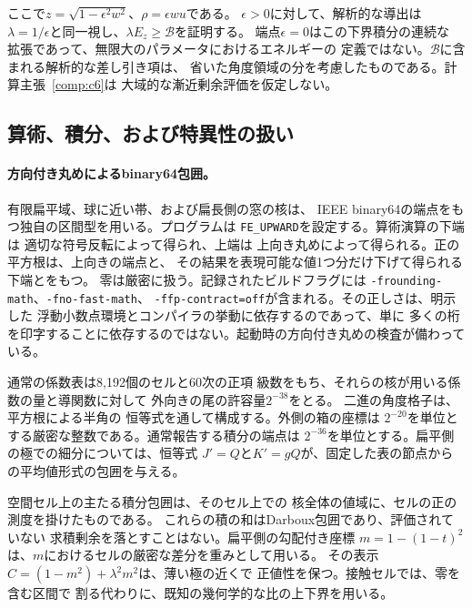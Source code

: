 ここで$z=\sqrt{1-\epsilon^2w^2}$、$\rho=\epsilon wu$である。
$\epsilon>0$に対して、解析的な導出は
$\lambda=1/\epsilon$と同一視し、$\lambda E_z\geq\mathcal B$を証明する。
端点$\epsilon=0$はこの下界積分の連続な
拡張であって、無限大のパラメータにおけるエネルギーの
定義ではない。$\mathcal B$に含まれる解析的な差し引き項は、
省いた角度領域の分を考慮したものである。計算主張~\ref{comp:c6}は
大域的な漸近剰余評価を仮定しない\citep{data-cap}。

\subsection{算術、積分、および特異性の扱い}
\label{subsec:computational-methods}

\paragraph{方向付き丸めによるbinary64包囲。}
有限扁平域、球に近い帯、および扁長側の窓の核は、
IEEE binary64の端点をもつ独自の区間型を用いる。プログラムは
\texttt{FE\_UPWARD}を設定する。算術演算の下端は
適切な符号反転によって得られ、上端は
上向き丸めによって得られる。正の平方根は、上向きの端点と、
その結果を表現可能な値1つ分だけ下げて得られる下端とをもつ。
零は厳密に扱う。記録されたビルドフラグには
\texttt{-frounding-math}、\texttt{-fno-fast-math}、
\texttt{-ffp-contract=off}が含まれる。その正しさは、明示した
浮動小数点環境とコンパイラの挙動に依存するのであって、単に
多くの桁を印字することに依存するのではない。起動時の方向付き丸めの検査が備わっている。

通常の係数表は8,192個のセルと60次の正項
級数をもち、それらの核が用いる係数の量と導関数に対して
外向きの尾の許容量$2^{-38}$をとる。
二進の角度格子は、平方根による半角の
恒等式を通して構成する。外側の箱の座標は
$2^{-20}$を単位とする厳密な整数である。通常報告する積分の端点は
$2^{-36}$を単位とする。扁平側の極での細分については、恒等式
$J'=Q$と$K'=gQ$が、固定した表の節点からの平均値形式の包囲を与える。

空間セル上の主たる積分包囲は、そのセル上での
核全体の値域に、セルの正の測度を掛けたものである。
これらの積の和はDarboux包囲であり、評価されていない
求積剰余を落とすことはない。扁平側の勾配付き座標
$m=1-(1-t)^2$は、$m$におけるセルの厳密な差分を重みとして用いる。
その表示$C=(1-m^2)+\lambda^2m^2$は、薄い極の近くで
正値性を保つ。接触セルでは、零を含む区間で
割る代わりに、既知の幾何学的な比の上下界を用いる。

